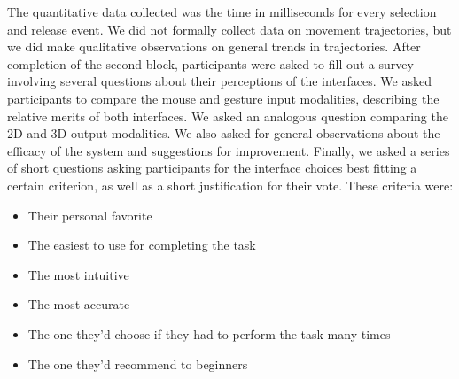 \documentclass[pageno]{jpaper}
\begin{document}
The quantitative data collected was the time in milliseconds for every selection and release event. We did not formally
collect data on movement trajectories, but we did make qualitative observations on general trends in
trajectories. After completion of the second block, participants were asked to fill out a survey involving several questions
about their perceptions of the interfaces. We asked participants to compare the mouse and gesture input modalities, describing the relative
merits of both interfaces. We asked an analogous question comparing the 2D and 3D output modalities. We also asked for
general observations about the efficacy of the system and suggestions for improvement. Finally, we asked a series of short questions asking participants for
the interface choices best fitting a certain criterion, as well as a short justification for their vote. These criteria were:
\begin{itemize}
\item Their personal favorite
\item The easiest to use for completing the task
\item The most intuitive
\item The most accurate
\item The one they'd choose if they had to perform the task many times
\item The one they'd recommend to beginners
\end{itemize}
\end{document}
